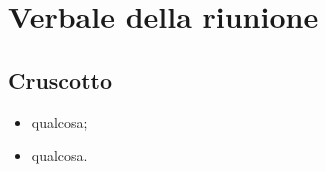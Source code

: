 \section{Verbale della riunione}

\subsection{Cruscotto}
    \begin{itemize}
        \item qualcosa;
        \item qualcosa.
    \end{itemize}
